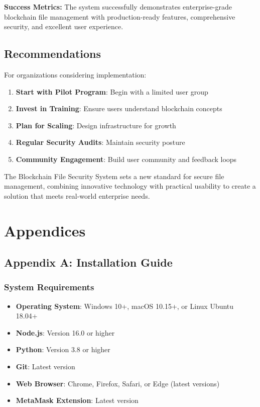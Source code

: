 \documentclass[11pt,a4paper]{article}
\begin{document}
\begin{successbox}
\textbf{Success Metrics:} The system successfully demonstrates enterprise-grade blockchain file management with production-ready features, comprehensive security, and excellent user experience.
\end{successbox}

\subsection{Recommendations}
For organizations considering implementation:

\begin{enumerate}
    \item \textbf{Start with Pilot Program}: Begin with a limited user group
    \item \textbf{Invest in Training}: Ensure users understand blockchain concepts
    \item \textbf{Plan for Scaling}: Design infrastructure for growth
    \item \textbf{Regular Security Audits}: Maintain security posture
    \item \textbf{Community Engagement}: Build user community and feedback loops
\end{enumerate}

The Blockchain File Security System sets a new standard for secure file management, combining innovative technology with practical usability to create a solution that meets real-world enterprise needs.

\newpage

\section{Appendices}

\subsection{Appendix A: Installation Guide}

\subsubsection{System Requirements}
\begin{itemize}
    \item \textbf{Operating System}: Windows 10+, macOS 10.15+, or Linux Ubuntu 18.04+
    \item \textbf{Node.js}: Version 16.0 or higher
    \item \textbf{Python}: Version 3.8 or higher
    \item \textbf{Git}: Latest version
    \item \textbf{Web Browser}: Chrome, Firefox, Safari, or Edge (latest versions)
    \item \textbf{MetaMask Extension}: Latest version
\end{itemize}
\end{document}

